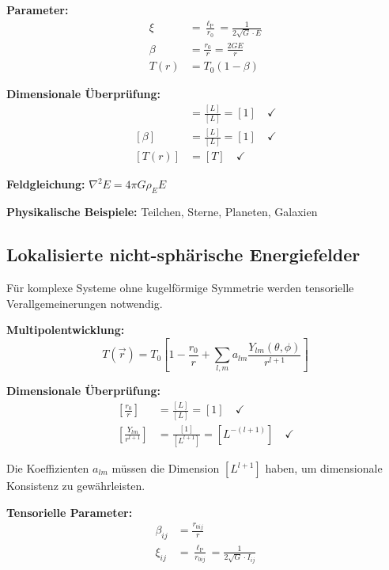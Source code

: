 \documentclass[12pt,a4paper]{report}
\newcommand{\lP}{\ell_{\text{P}}}         %
\newcommand{\rzero}{r_0}                  %
\begin{document}
	\textbf{Parameter:}
	\begin{align}
		\xi &= \frac{\lP}{\rzero} = \frac{1}{2\sqrt{G} \cdot E} \\
		\beta &= \frac{\rzero}{r} = \frac{2GE}{r} \\
		T(r) &= T_0(1 - \beta)
	\end{align}
	
	\textbf{Dimensionale Überprüfung:}
	\begin{align}
		[\xi] &= \frac{[L]}{[L]} = [1] \quad \checkmark \\
		[\beta] &= \frac{[L]}{[L]} = [1] \quad \checkmark \\
		[T(r)] &= [T] \quad \checkmark
	\end{align}
	
	\textbf{Feldgleichung:} $\nabla^2 E = 4\pi G \rho_E E$
	
	\textbf{Physikalische Beispiele:} Teilchen, Sterne, Planeten, Galaxien
	
	\subsection{Lokalisierte nicht-sphärische Energiefelder}
	\label{subsec:localized_nonsphere}
	
	Für komplexe Systeme ohne kugelförmige Symmetrie werden tensorielle Verallgemeinerungen notwendig.
	
	\textbf{Multipolentwicklung:}
	\begin{equation}
		T(\vec{r}) = T_0\left[1 - \frac{\rzero}{r} + \sum_{l,m} a_{lm} \frac{Y_{lm}(\theta,\phi)}{r^{l+1}}\right]
		\label{eq:multipole_expansion}
	\end{equation}
	
	\textbf{Dimensionale Überprüfung:}
	\begin{align}
		\left[\frac{\rzero}{r}\right] &= \frac{[L]}{[L]} = [1] \quad \checkmark \\
		\left[\frac{Y_{lm}}{r^{l+1}}\right] &= \frac{[1]}{[L^{l+1}]} = [L^{-(l+1)}] \quad \checkmark
	\end{align}
	
	Die Koeffizienten $a_{lm}$ müssen die Dimension $[L^{l+1}]$ haben, um dimensionale Konsistenz zu gewährleisten.
	
	\textbf{Tensorielle Parameter:}
	\begin{align}
		\beta_{ij} &= \frac{r_{0ij}}{r} \\
		\xi_{ij} &= \frac{\lP}{r_{0ij}} = \frac{1}{2\sqrt{G} \cdot I_{ij}}
	\end{align}
	
\end{document}
